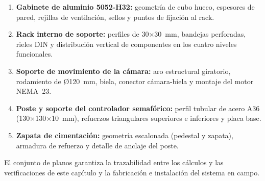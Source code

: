 \begin{enumerate}
  \item \textbf{Gabinete de aluminio 5052-H32:} geometría de cubo hueco, espesores de pared, rejillas de ventilación, sellos y puntos de fijación al rack.
  \item \textbf{Rack interno de soporte:} perfiles de 30$\times$30~mm, bandejas perforadas, rieles DIN y distribución vertical de componentes en los cuatro niveles funcionales.
  \item \textbf{Soporte de movimiento de la cámara:} aro estructural giratorio, rodamiento de Ø120~mm, biela, conector cámara-biela y montaje del motor NEMA~23.
  \item \textbf{Poste y soporte del controlador semafórico:} perfil tubular de acero A36 (130$\times$130$\times$10~mm), refuerzos triangulares superiores e inferiores y placa base.
  \item \textbf{Zapata de cimentación:} geometría escalonada (pedestal y zapata), armadura de refuerzo y detalle de anclaje del poste.
\end{enumerate}

El conjunto de planos garantiza la trazabilidad entre los cálculos y las verificaciones de este capítulo y la fabricación e instalación del sistema en campo.
